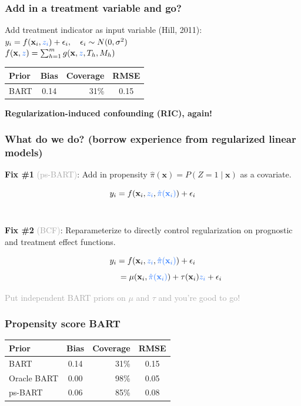 \documentclass{beamer}
\newcommand{\bo}[1]{\textcolor{burntorange}{#1}}
\newcommand{\lb}[1]{\textcolor{lightblue}{#1}}
\newcommand{\dg}[1]{\textcolor{darkgray}{#1}}
\newcommand{\sk}{\vspace{.5cm}}
\begin{document}
\begin{frame}
	\frametitle{Add in a treatment variable and go?}
Add treatment indicator as input variable (Hill, 2011): \\ \sk
$y_i = f(\mathbf{x}_i, \lb{z_i}) + \epsilon_i,\quad \epsilon_i\sim N(0, \sigma^2)$ \\ \sk
$f(\mathbf{x}, \lb{z}) = \sum_{h=1}^m g(\mathbf{x}, \lb{z}, T_h, M_h)$
	 
\sk \pause
\begin{center}
	\begin{tabular}{lcrc}
Prior & Bias & Coverage & RMSE\\
\hline
BART & 0.14& 31\% & 0.15\\
\hline
\end{tabular}
\end{center}

\sk
\bo{\bf Regularization-induced confounding (RIC), again!}
	
	
\end{frame}

\begin{frame}
	\frametitle{What do we do? {\small (borrow experience from regularized linear models)}}
	
	\bo{\bf Fix \#1} \dg{\small (ps-BART)}: Add in propensity $\hat{\pi}(\mathbf{x}) = P(Z=1 \mid \mathbf{x})$ as a covariate.
	
	$$y_i = f(\mathbf{x}_i, \lb{z_i},\lb{\hat{\pi}(\mathbf{x}_i)}) + \epsilon_i$$  \\ \sk\sk

	\bo{\bf Fix \#2} \dg{\small (BCF)}: Reparameterize to directly control regularization on prognostic and treatment effect functions.

	
	$$y_i = f(\mathbf{x}_i,\lb{z_i},\lb{\hat{\pi}(\mathbf{x}_i)}) + \epsilon_i$$
	$$\hspace*{16mm}= \mu(\mathbf{x}_i,\lb{\hat{\pi}(\mathbf{x}_i)}) + \tau(\mathbf{x}_i)\lb{z_i} + \epsilon_i$$
	
	\dg{\small Put independent BART priors on $\mu$ and $\tau$ and you're good to go!}
\end{frame}

\begin{frame}
	\frametitle{Propensity score BART}
	
	\begin{center}
\begin{tabular}{lcrc}
Prior & Bias & Coverage & RMSE\\
\hline
BART & 0.14& 31\% & 0.15\\
Oracle BART & 0.00&98\% &0.05\\
ps-BART & 0.06& 85\%&0.08 \\
\hline
\end{tabular}
\end{center}
\end{frame}
\end{document}
